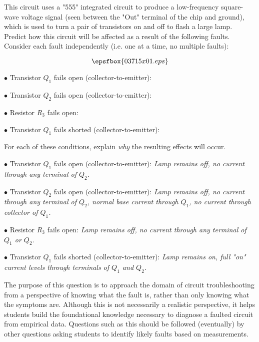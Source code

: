 

This circuit uses a "555" integrated circuit to produce a low-frequency square-wave voltage signal (seen between the "Out" terminal of the chip and ground), which is used to turn a pair of transistors on and off to flash a large lamp.  Predict how this circuit will be affected as a result of the following faults.  Consider each fault independently (i.e. one at a time, no multiple faults):

$$\epsfbox{03715x01.eps}$$

\medskip
\item{$\bullet$} Transistor $Q_1$ fails open (collector-to-emitter):
\vskip 5pt
\item{$\bullet$} Transistor $Q_2$ fails open (collector-to-emitter):
\vskip 5pt
\item{$\bullet$} Resistor $R_3$ fails open:
\vskip 5pt
\item{$\bullet$} Transistor $Q_1$ fails shorted (collector-to-emitter):
\medskip

For each of these conditions, explain {\it why} the resulting effects will occur.







\medskip
\item{$\bullet$} Transistor $Q_1$ fails open (collector-to-emitter): {\it Lamp remains off, no current through any terminal of $Q_2$.}
\vskip 5pt
\item{$\bullet$} Transistor $Q_2$ fails open (collector-to-emitter): {\it Lamp remains off, no current through any terminal of $Q_2$, normal base current through $Q_1$, no current through collector of $Q_1$.}
\vskip 5pt
\item{$\bullet$} Resistor $R_3$ fails open: {\it Lamp remains off, no current through any terminal of $Q_1$ or $Q_2$.}
\vskip 5pt
\item{$\bullet$} Transistor $Q_1$ fails shorted (collector-to-emitter): {\it Lamp remains on, full "on" current levels through terminals of $Q_1$ and $Q_2$.}
\medskip







The purpose of this question is to approach the domain of circuit troubleshooting from a perspective of knowing what the fault is, rather than only knowing what the symptoms are.  Although this is not necessarily a realistic perspective, it helps students build the foundational knowledge necessary to diagnose a faulted circuit from empirical data.  Questions such as this should be followed (eventually) by other questions asking students to identify likely faults based on measurements.




